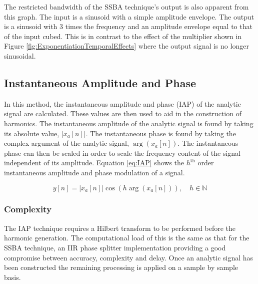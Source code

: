 			The restricted bandwidth of the SSBA technique's output is also apparent from this graph. The input
			is a sinusoid with a simple amplitude envelope. The output is a sinusoid with 3 times the frequency
			and an amplitude envelope equal to that of the input cubed. This is in contrast to the effect of
			the multiplier shown in Figure \ref{fig:ExponentiationTemporalEffects} where the output signal is
			no longer sinusoidal.


	\subsection{Instantaneous Amplitude and Phase}
	\label{sec:Excitation-IAP}
		In this method, the instantaneous amplitude and phase (IAP) of the analytic signal are calculated. These
		values are then used to aid in the construction of harmonics. The instantaneous amplitude of the analytic
		signal is found by taking its absolute value, $|x_{a}[n]|$. The instantaneous phase is found by taking the
		complex argument of the analytic signal, $\arg(x_{a}[n])$. The instantaneous phase can then be scaled in
		order to scale the frequency content of the signal independent of its amplitude. Equation \ref{eq:IAP}
		shows the $h^{\text{th}}$ order instantaneous amplitude and phase modulation of a signal.

		\begin{equation}
			y[n] = |x_{a}[n]| \cos \left( h\arg(x_{a}[n]) \right), \quad h \in \mathbb{N}
			\label{eq:IAP}
		\end{equation}

		\subsubsection*{Complexity}
			The IAP technique requires a Hilbert transform to be performed before the harmonic generation. The
			computational load of this is the same as that for the SSBA technique, an IIR phase splitter
			implementation providing a good compromise between accuracy, complexity and delay. Once an analytic
			signal has been constructed the remaining processing is applied on a sample by sample basis. 
			
